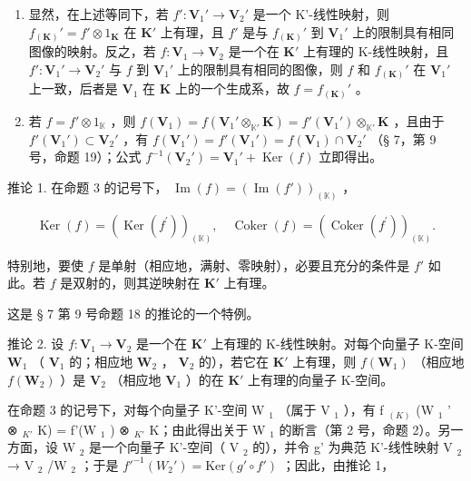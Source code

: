 \begin{enumerate}
\def\labelenumi{(\roman{enumi})}
\item
  显然，在上述等同下，若 \(f': \mathbf{V}_1' \to \mathbf{V}_2'\) 是一个 K'-线性映射，则 \(f_{(\mathbf{K})}' = f' \otimes 1_{\mathbf{K}}\) 在 \(\mathbf{K}'\) 上有理，且 \(f'\) 是与 \(f_{(\mathbf{K})}'\) 到 \(\mathbf{V}_1'\) 上的限制具有相同图像的映射。反之，若 \(f: \mathbf{V}_1 \to \mathbf{V}_2\) 是一个在 \(\mathbf{K}'\) 上有理的 K-线性映射，且 \(f': \mathbf{V}_1' \to \mathbf{V}_2'\) 与 \(f\) 到 \(\mathbf{V}_1'\) 上的限制具有相同的图像，则 \(f\) 和 \(f_{(\mathbf{K})}'\) 在 \(\mathbf{V}_1'\) 上一致，后者是 \(\mathbf{V}_1\) 在 \(\mathbf{K}\) 上的一个生成系，故 \(f = f_{(\mathbf{K})}'\) 。
\item
  若 \(f = f' \otimes 1_{\mathbb{K}}\) ，则 \(f(\mathbf{V}_1) = f(\mathbf{V}_1' \otimes_{\mathbb{K}'} \mathbf{K}) = f'(\mathbf{V}_1') \otimes_{\mathbb{K}'} \mathbf{K}\) ，且由于 \(f'(\mathbf{V}_1') \subset \mathbf{V}_2'\) ，有 \(f(\mathbf{V}_1') = f'(\mathbf{V}_1') = f(\mathbf{V}_1) \cap \mathbf{V}_2'\) （§ 7，第 9 号，命题 19）；公式 \(f^{-1}(\mathbf{V}_2') = \mathbf{V}_1' + \operatorname{Ker}(f)\) 立即得出。
\end{enumerate}

推论 1. 在命题 3 的记号下， \(\operatorname{Im}(f) = (\operatorname{Im}(f'))_{(\mathbb{K})}\) ，

\[
\operatorname{Ker} (f) = (\operatorname{Ker} (f ^ {\prime})) _ {(\mathbb {K})}, \quad \operatorname{Coker} (f) = (\operatorname{Coker} (f ^ {\prime})) _ {(\mathbb {K})}.
\]

特别地，要使 \(f\) 是单射（相应地，满射、零映射），必要且充分的条件是 \(f'\) 如此。若 \(f\) 是双射的，则其逆映射在 \(\mathbf{K}'\) 上有理。

这是 § 7 第 9 号命题 18 的推论的一个特例。

推论 2. 设 \(f: \mathbf{V}_1 \to \mathbf{V}_2\) 是一个在 \(\mathbf{K}'\) 上有理的 K-线性映射。对每个向量子 K-空间 \(\mathbf{W}_1\) （ \(\mathbf{V}_1\) 的；相应地 \(\mathbf{W}_2\) ， \(\mathbf{V}_2\) 的），若它在 \(\mathbf{K}'\) 上有理，则 \(f(\mathbf{W}_1)\) （相应地 \(f(\mathbf{W}_2)\) ）是 \(\mathbf{V}_2\) （相应地 \(\mathbf{V}_1\) ）的在 \(\mathbf{K}'\) 上有理的向量子 K-空间。

在命题 3 的记号下，对每个向量子 K'-空间 W \(_{1}\) （属于 V \(_{1}\) ），有 f \(_{(K)}\) (W \(_{1}\) ' ⊗ \(_{K'}\) K) = f'(W \(_{1}\) ) ⊗ \(_{K'}\) K；由此得出关于 W \(_{1}\) 的断言（第 2 号，命题 2）。另一方面，设 W \(_{2}\) 是一个向量子 K'-空间（ V \(_{2}\) 的），并令 g' 为典范 K'-线性映射 V \(_{2}\) → V \(_{2}\) /W \(_{2}\) ；于是 \(f'^{-1}(W_{2}') = \text{Ker}(g' \circ f')\) ；因此，由推论 1，

